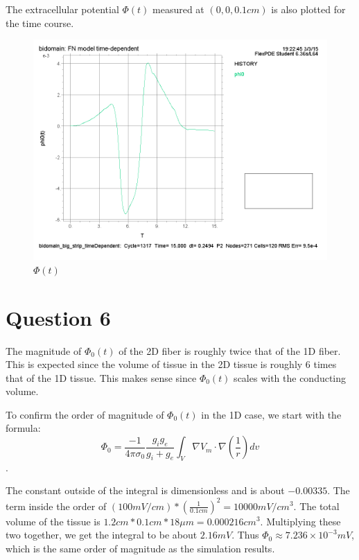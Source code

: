 \documentclass{article}
\begin{document}
The extracellular potential $\Phi(t)$ measured at $(0,0,0.1cm)$ is also plotted for the time course.

\begin{figure}[H]
    \begin{center}
        \includegraphics[scale=0.5]{2Dstrip_Phi0_Origin_tmax=15ms.png}
        \caption{$\Phi(t)$}
    \end{center}
\end{figure}

\section{Question 6}
The magnitude of $\Phi_0(t)$ of the 2D fiber is roughly twice that of the 1D fiber. This is expected since the volume of tissue in the 2D tissue is roughly 6 times that of the 1D tissue. This makes sense since $\Phi_0(t)$ scales with the conducting volume.

To confirm the order of magnitude of $\Phi_0(t)$ in the 1D case, we start with the formula:
\[\Phi_0 = \frac{-1}{4\pi\sigma_0}\frac{g_ig_e}{g_i+g_e}\int_V\nabla V_m\cdot\nabla(\frac{1}{r})dv\].

The constant outside of the integral is dimensionless and is about $-0.00335$. The term inside the order of $(100mV/cm)*(\frac{1}{0.1cm})^2=10000mV/cm^3$. The total volume of the tissue is $1.2cm*0.1cm*18\mu m=0.000216cm^3$. Multiplying these two together, we get the integral to be about $2.16mV$. Thus $\Phi_0\approx 7.236\times10^{-3}mV$, which is the same order of magnitude as the simulation results.
\end{document}
